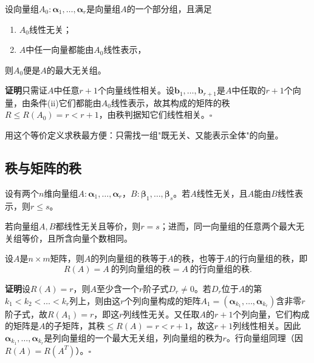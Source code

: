 \begin{corollary}[最大无关组的等价定义]
设向量组$A_0:\boldsymbol{\alpha}_1,\dots,\boldsymbol{\alpha}_r$是向量组$A$的一个部分组，且满足
\begin{enumerate}
    \item[(i)] $A_0$线性无关；
    \item[(ii)] $A$中任一向量都能由$A_0$线性表示，
\end{enumerate}
则$A_0$便是$A$的最大无关组。
\end{corollary}

\textbf{证明}\quad 只需证$A$中任意$r+1$个向量线性相关。设$\boldsymbol{b}_1,\dots,\boldsymbol{b}_{r+1}$是$A$中任取的$r+1$个向量，由条件(ii)它们都能由$A_0$线性表示，故其构成的矩阵的秩$R\le R(A_0)=r<r+1$，由秩判据知它们线性相关。\hfill$\square$

用这个等价定义求秩最方便：只需找一组"既无关、又能表示全体"的向量。

\subsection{秩与矩阵的秩}
\begin{theorem}
设有两个$n$维向量组$A:\boldsymbol{\alpha}_1,\dots,\boldsymbol{\alpha}_r$，$B:\boldsymbol{\beta}_1,\dots,\boldsymbol{\beta}_s$。若$A$线性无关，且$A$能由$B$线性表示，则$r\le s$。
\end{theorem}

\begin{corollary}
若向量组$A,B$都线性无关且等价，则$r=s$；进而，同一向量组的任意两个最大无关组等价，且所含向量个数相同。
\end{corollary}

\begin{theorem}[矩阵的秩等于行秩、列秩]
设$A$是$n\times m$矩阵，则$A$的列向量组的秩等于$A$的秩，也等于$A$的行向量组的秩，即
\[
R(A)=A\ \text{的列向量组的秩}=A\ \text{的行向量组的秩}.
\]
\end{theorem}

\textbf{证明}\quad 设$R(A)=r$，则$A$至少含一个$r$阶子式$D_r\ne0$。若$D_r$位于$A$的第$k_1<k_2<\dots<k_r$列上，则由这$r$个列向量构成的矩阵$A_1=(\boldsymbol{\alpha}_{k_1},\dots,\boldsymbol{\alpha}_{k_r})$含非零$r$阶子式，故$R(A_1)=r$，即这$r$列线性无关。又任取$A$的$r+1$个列向量，它们构成的矩阵是$A$的子矩阵，其秩$\le R(A)=r<r+1$，故这$r+1$列线性相关。因此$\boldsymbol{\alpha}_{k_1},\dots,\boldsymbol{\alpha}_{k_r}$是列向量组的一个最大无关组，列向量组的秩为$r$。行向量组同理（因$R(A)=R(A^{T})$）。\hfill$\square$

